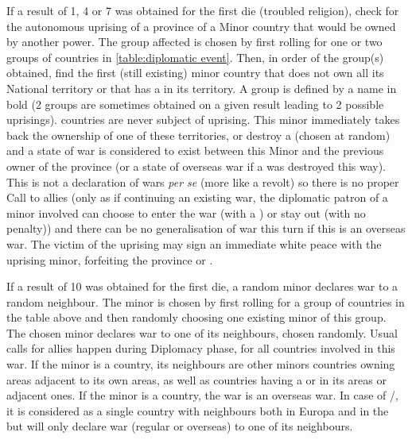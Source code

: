 \label{chEvents:diplomacy:uprising} If a result of 1, 4 or 7
was obtained for the first die (troubled religion), check for the
autonomous uprising of a province of a Minor country that would be owned
by another power.
\bparag The group affected is chosen by first rolling for one or two
groups of countries in \ref{table:diplomatic event}. Then, in order of
the group(s) obtained, find the first (still existing) minor country
that does not own all its National territory or that has a \Presidio in
its territory. A group is defined by a name in bold (2 groups are
sometimes obtained on a given result leading to 2 possible uprisings).
\bparag \ROTW countries are never subject of uprising.%
\bparag This minor immediately takes back the ownership of one of these
territories, or destroy a \Presidio (chosen at random) and a state of
war is considered to exist between this Minor and the previous owner of
the province (or a state of overseas war if a \Presidio was destroyed
this way). This is not a declaration of wars \emph{per se} (more like a
revolt) so there is no proper Call to allies (only as if continuing an
existing war, the diplomatic patron of a minor involved can choose to
enter the war (with a \CB) or stay out (with no penalty)) and there can
be no generalisation of war this turn if this is an overseas war.
\bparag The \MAJ victim of the uprising may sign an immediate white
peace with the uprising minor, forfeiting the province or \Presidio.

 If a result of 10 was obtained for the
first die, a random minor declares war to a random neighbour.
\bparag The minor is chosen by first rolling for a group of countries in
the table above and then randomly choosing one existing minor of this
group.
\bparag The chosen minor declares war to one of its neighbours, chosen
randomly.
\bparag Usual calls for allies happen during Diplomacy phase, for all
countries involved in this war.
\bparag If the minor is a \ROTW country, its neighbours are other minors
countries owning areas adjacent to its own areas, as well as countries
having a \TP or \COL in its areas or adjacent ones.
\bparag If the minor is a \ROTW country, the war is an overseas war.
\bparag In case of \paysPerse/\paysOrmus, it is considered as a single
country with neighbours both in Europa and in the \ROTW but will only
declare war (regular or overseas) to one of its neighbours.




